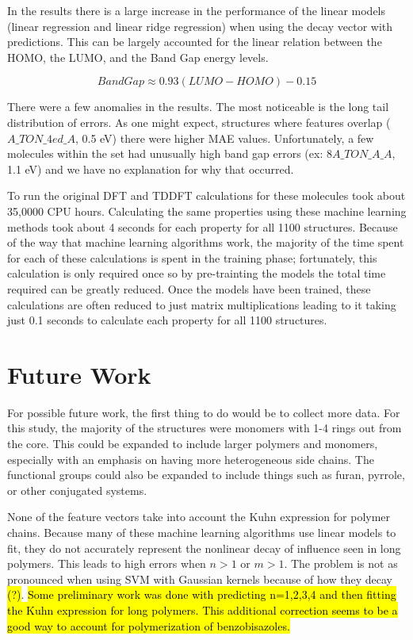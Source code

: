 \documentclass[10pt]{article}
\begin{document}
In the results there is a large increase in the performance of the linear models (linear regression and linear ridge regression) when using the decay vector with predictions. This can be largely accounted for the linear relation between the HOMO, the LUMO, and the Band Gap energy levels.

$$BandGap \approx 0.93 (LUMO - HOMO) - 0.15$$

There were a few anomalies in the results. The most noticeable is the long tail distribution of errors. As one might expect, structures where features overlap ($A\_TON\_4ed\_A$, 0.5 eV) there were higher MAE values. Unfortunately, a few molecules within the set had unusually high band gap errors (ex: $8A\_TON\_A\_A$, 1.1 eV) and we have no explanation for why that occurred.

To run the original DFT and TDDFT calculations for these molecules took about 35,0000 CPU hours. Calculating the same properties using these machine learning methods took about 4 seconds for each property for all 1100 structures. Because of the way that machine learning algorithms work, the majority of the time spent for each of these calculations is spent in the training phase; fortunately, this calculation is only required once so by pre-trainting the models the total time required can be greatly reduced. Once the models have been trained, these calculations are often reduced to just matrix multiplications leading to it taking just 0.1 seconds to calculate each property for all 1100 structures.


\section{Future Work}

For possible future work, the first thing to do would be to collect more data. For this study, the majority of the structures were monomers with 1-4 rings out from the core. This could be expanded to include larger polymers and monomers, especially with an emphasis on having more heterogeneous side chains. The functional groups could also be expanded to include things such as furan, pyrrole, or other conjugated systems.

None of the feature vectors take into account the Kuhn expression for polymer chains. Because many of these machine learning algorithms use linear models to fit, they do not accurately represent the nonlinear decay of influence seen in long polymers. This leads to high errors when $n>1$ or $m>1$. The problem is not as pronounced when using SVM with Gaussian kernels because of how they decay \hl{(?)}. \hl{Some preliminary work was done with predicting n=1,2,3,4 and then fitting the Kuhn expression for long polymers. This additional correction seems to be a good way to account for polymerization of benzobisazoles.}
\end{document}
